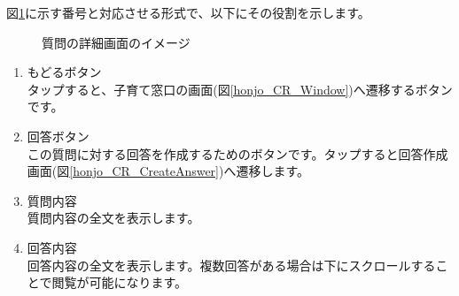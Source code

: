 \documentclass[a4j]{jarticle}
\begin{document}
図\ref{honjo_CR_Answer}に示す番号と対応させる形式で、以下にその役割を示します。

\begin{figure}[H]
    \begin{center}
    \caption {質問の詳細画面のイメージ}
    \label{honjo_CR_Answer}
    \end{center}
\end{figure}

\begin{enumerate}
  \renewcommand{\labelenumi}{\textcircled{\scriptsize \theenumi}}
  \item もどるボタン\\
        タップすると、子育て窓口の画面(図\ref{honjo_CR_Window})へ遷移するボタンです。
  \item 回答ボタン\\
        この質問に対する回答を作成するためのボタンです。タップすると回答作成画面(図\ref{honjo_CR_CreateAnswer})へ遷移します。
  \item 質問内容\\
        質問内容の全文を表示します。
  \item 回答内容\\
        回答内容の全文を表示します。複数回答がある場合は下にスクロールすることで閲覧が可能になります。
\end{enumerate}
\end{document}
